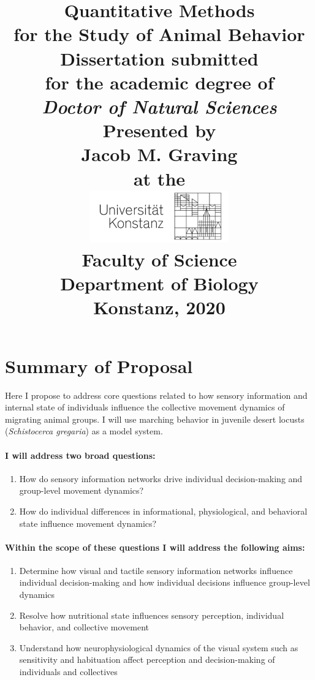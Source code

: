 \documentclass[11pt,a4paper,oneside]{article}
\title{
	\LARGE \textbf{Quantitative Methods} \\
	\LARGE \textbf{for the Study of Animal Behavior} \\
	\vspace{4cm}
	\Large Dissertation submitted \\
	\Large for the academic degree of \\
	\vspace{0.5cm}
	\Large \textit{Doctor of Natural Sciences} \\

	\vspace{2cm}
    \Large Presented by \\
    \vspace{0.5cm}
    \LARGE Jacob M. Graving \\
    \vspace{0.5cm}
    \Large at the \\
    \vspace{0.1cm}
	\includegraphics[width=6cm]{Graving_IMPRS_Thesis/graphics/uni_logo.png}\\
	\vspace{2cm}
	\Large Faculty of Science \\
	\Large Department of Biology \\
	\vspace{2cm}
	\Large Konstanz, 2020
	\date{}
}
\begin{document}
	\maketitle
    \newpage
	\tableofcontents
	\newpage
	\label{listoffigures}
	\listoffigures
	\newpage
	\section{Summary of Proposal}
	\par
	Here I propose to address core questions related to how sensory information and internal state of individuals influence the collective movement dynamics of migrating animal groups. I will use marching behavior in juvenile desert locusts (\textit{Schistocerca gregaria}) as a model system.
	
	\paragraph{I will address two broad questions:}
	\begin{enumerate}
		\item How do sensory information networks drive individual decision-making and group-level movement dynamics?
		\item How do individual differences in informational, physiological, and behavioral state influence movement dynamics? 
	\end{enumerate}

	\paragraph{Within the scope of these questions I will address the following aims:}
	\begin{enumerate}
		\item Determine how visual and tactile sensory information networks influence individual decision-making and  how individual decisions influence group-level dynamics
		\item Resolve how nutritional state influences sensory perception, individual behavior, and collective movement
		\item Understand how neurophysiological dynamics of the visual system such as sensitivity and habituation affect perception and decision-making of individuals and collectives
	\end{enumerate}
\end{document}
